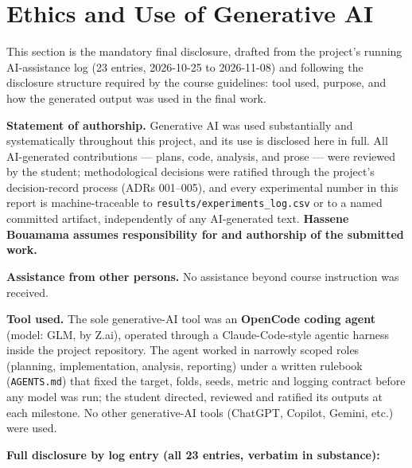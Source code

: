 \documentclass[11pt,a4paper]{article}
\begin{document}
\section{Ethics and Use of Generative
AI}\label{ethics-and-use-of-generative-ai}

This section is the mandatory final disclosure, drafted from the
project's running AI-assistance log (23 entries, 2026-10-25 to
2026-11-08) and following the disclosure structure required by the
course guidelines: tool used, purpose, and how the generated output was
used in the final work.

\textbf{Statement of authorship.} Generative AI was used substantially
and systematically throughout this project, and its use is disclosed
here in full. All AI-generated contributions --- plans, code, analysis,
and prose --- were reviewed by the student; methodological decisions
were ratified through the project's decision-record process (ADRs
001--005), and every experimental number in this report is
machine-traceable to \texttt{results/experiments\_log.csv} or to a named
committed artifact, independently of any AI-generated text.
\textbf{Hassene Bouamama assumes responsibility for and authorship of
the submitted work.}

\textbf{Assistance from other persons.} No assistance beyond course
instruction was received.

\textbf{Tool used.} The sole generative-AI tool was an \textbf{OpenCode
coding agent} (model: GLM, by Z.ai), operated through a
Claude-Code-style agentic harness inside the project repository. The
agent worked in narrowly scoped roles (planning, implementation,
analysis, reporting) under a written rulebook (\texttt{AGENTS.md}) that
fixed the target, folds, seeds, metric and logging contract before any
model was run; the student directed, reviewed and ratified its outputs
at each milestone. No other generative-AI tools (ChatGPT, Copilot,
Gemini, etc.) were used.

\textbf{Full disclosure by log entry (all 23 entries, verbatim in
substance):}
\end{document}
